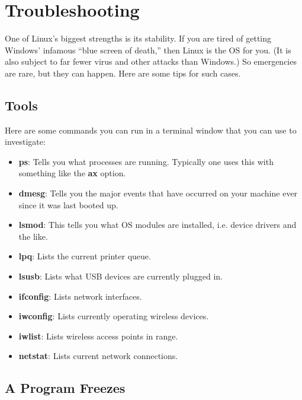 \documentclass[11pt]{article}
\begin{document}
\section{Troubleshooting}

One of Linux's biggest strengths is its stability.  If you are tired of
getting Windows' infamous ``blue screen of death,'' then Linux is the OS
for you.  (It is also subject to far fewer virus and other attacks than
Windows.)  So emergencies are rare, but they can happen.  Here are some
tips for such cases.

\subsection{Tools}

Here are some commands you can run in a terminal window that you can use
to investigate:

\begin{itemize}

\item {\bf ps}:  Tells you what processes are running.  Typically
one uses this with something like the {\bf ax} option.

\item {\bf dmesg}:  Tells you the major events that have occurred
on your machine ever since it was last booted up.

\item {\bf lsmod}:  This tells you what OS modules are installed, i.e.
device drivers and the like.

\item {\bf lpq}:  Lists the current printer queue.

\item {\bf lsusb}:  Lists what USB devices are currently plugged in.

\item {\bf ifconfig}:  Lists network interfaces.

\item {\bf iwconfig}:  Lists currently operating wireless devices.

\item {\bf iwlist}:  Lists wireless access points in range.

\item {\bf netstat}:  Lists current network connections.

\end{itemize}

\subsection{A Program Freezes}
\end{document}
